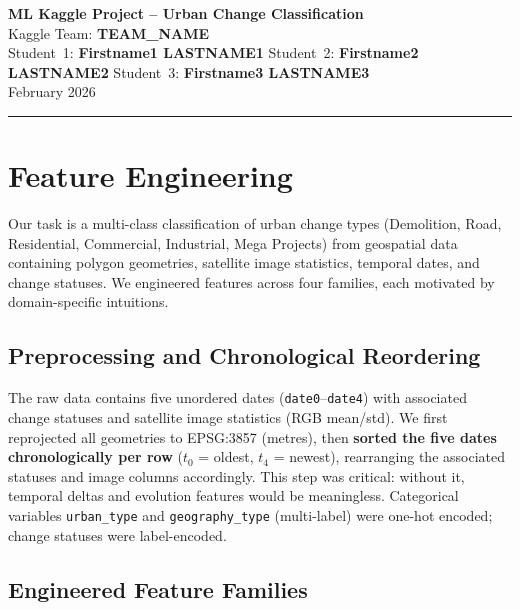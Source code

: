 \documentclass[11pt,a4paper]{article}
\begin{document}
\begin{center}
    {\LARGE \textbf{ML Kaggle Project -- Urban Change Classification}}\\[6pt]
    {\large Kaggle Team: \textbf{TEAM\_NAME}}\\[4pt]
    {Student~1: \textbf{Firstname1 LASTNAME1} \quad
     Student~2: \textbf{Firstname2 LASTNAME2} \quad
     Student~3: \textbf{Firstname3 LASTNAME3}}\\[2pt]
    {\small February 2026}
\end{center}

\vspace{-4pt}
\hrule
\vspace{6pt}

\section{Feature Engineering}

Our task is a multi-class classification of urban change types (Demolition, Road, Residential, Commercial, Industrial, Mega Projects) from geospatial data containing polygon geometries, satellite image statistics, temporal dates, and change statuses. We engineered features across four families, each motivated by domain-specific intuitions.

\subsection{Preprocessing and Chronological Reordering}

The raw data contains five unordered dates (\texttt{date0}--\texttt{date4}) with associated change statuses and satellite image statistics (RGB mean/std). We first reprojected all geometries to EPSG:3857 (metres), then \textbf{sorted the five dates chronologically per row} ($t_0$ = oldest, $t_4$ = newest), rearranging the associated statuses and image columns accordingly. This step was critical: without it, temporal deltas and evolution features would be meaningless.  Categorical variables \texttt{urban\_type} and \texttt{geography\_type} (multi-label) were one-hot encoded; change statuses were label-encoded.

\subsection{Engineered Feature Families}
\end{document}
